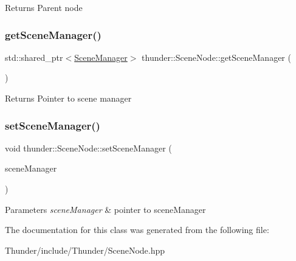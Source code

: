 \begin{DoxyReturn}{Returns}
Parent node 
\end{DoxyReturn}
\mbox{\label{classthunder_1_1_scene_node_aa4da20b8a7369dcb4b2ac262c3701849}} 
\subsubsection{\texorpdfstring{get\+Scene\+Manager()}{getSceneManager()}}
{\footnotesize\ttfamily std\+::shared\+\_\+ptr$<$\mbox{\hyperlink{classthunder_1_1_scene_manager}{Scene\+Manager}}$>$ thunder\+::\+Scene\+Node\+::get\+Scene\+Manager (\begin{DoxyParamCaption}{ }\end{DoxyParamCaption})\hspace{0.3cm}{\ttfamily [inline]}}

\begin{DoxyReturn}{Returns}
Pointer to scene manager 
\end{DoxyReturn}
\mbox{\label{classthunder_1_1_scene_node_a530678fd497174c7409b67d372dd12ed}} 
\subsubsection{\texorpdfstring{set\+Scene\+Manager()}{setSceneManager()}}
{\footnotesize\ttfamily void thunder\+::\+Scene\+Node\+::set\+Scene\+Manager (\begin{DoxyParamCaption}\item[{std\+::shared\+\_\+ptr$<$ \mbox{\hyperlink{classthunder_1_1_scene_manager}{Scene\+Manager}} $>$}]{scene\+Manager }\end{DoxyParamCaption})}


\begin{DoxyParams}{Parameters}
{\em scene\+Manager} & pointer to scene\+Manager \\
\hline
\end{DoxyParams}


The documentation for this class was generated from the following file\+:\begin{DoxyCompactItemize}
\item 
Thunder/include/\+Thunder/Scene\+Node.\+hpp\end{DoxyCompactItemize}

